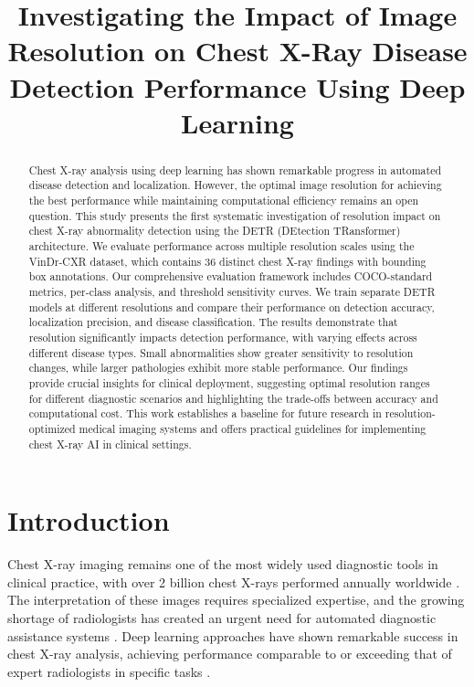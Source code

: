 \documentclass[10pt,twocolumn]{article}
\title{Investigating the Impact of Image Resolution on Chest X-Ray Disease Detection Performance Using Deep Learning}
\author{
\IEEEauthorblockN{Anonymous Authors}
\IEEEauthorblockA{Anonymous Institution\\
Anonymous City, Country\\
Email: anonymous@example.com}
}
\begin{document}
\maketitle

\begin{abstract}
Chest X-ray analysis using deep learning has shown remarkable progress in automated disease detection and localization. However, the optimal image resolution for achieving the best performance while maintaining computational efficiency remains an open question. This study presents the first systematic investigation of resolution impact on chest X-ray abnormality detection using the DETR (DEtection TRansformer) architecture. We evaluate performance across multiple resolution scales using the VinDr-CXR dataset, which contains 36 distinct chest X-ray findings with bounding box annotations. Our comprehensive evaluation framework includes COCO-standard metrics, per-class analysis, and threshold sensitivity curves. We train separate DETR models at different resolutions and compare their performance on detection accuracy, localization precision, and disease classification. The results demonstrate that resolution significantly impacts detection performance, with varying effects across different disease types. Small abnormalities show greater sensitivity to resolution changes, while larger pathologies exhibit more stable performance. Our findings provide crucial insights for clinical deployment, suggesting optimal resolution ranges for different diagnostic scenarios and highlighting the trade-offs between accuracy and computational cost. This work establishes a baseline for future research in resolution-optimized medical imaging systems and offers practical guidelines for implementing chest X-ray AI in clinical settings.
\end{abstract}

\section{Introduction}

Chest X-ray imaging remains one of the most widely used diagnostic tools in clinical practice, with over 2 billion chest X-rays performed annually worldwide \cite{who_radiology}. The interpretation of these images requires specialized expertise, and the growing shortage of radiologists has created an urgent need for automated diagnostic assistance systems \cite{radiology_shortage}. Deep learning approaches have shown remarkable success in chest X-ray analysis, achieving performance comparable to or exceeding that of expert radiologists in specific tasks \cite{chexnet,chexpert}.
\end{document}

